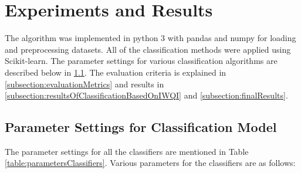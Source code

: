 \section{Experiments and Results}
\label{section:expAndRes}
The algorithm was implemented in python 3 with pandas and numpy for loading and preprocessing datasets. All of the classification methods were applied using Scikit-learn\cite{article:scikit-learn}. The parameter settings for various classification algorithms are described below in \ref{subsection:parameterSettings}. The evaluation criteria is explained in \ref{subsection:evaluationMetrics} and results in \ref{subsection:resultsOfClassificationBasedOnIWQI} and \ref{subsection:finalResults}. 

\subsection{Parameter Settings for Classification Model}
\label{subsection:parameterSettings}
The parameter settings for all the classifiers are mentioned in Table \ref{table:parametersClassifiers}. Various parameters for the classifiers are as follows:

